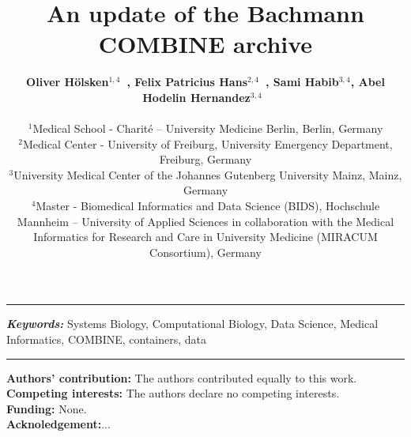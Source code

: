 \documentclass[a4paper, 12pt]{article}
\title{An update of the Bachmann COMBINE archive}
\date{} %
\providecommand{\keywords}[1]
{
  \small	
  \textbf{\textit{Keywords: }} #1
}
\begin{document}
\maketitle

  \noindent\author{\textbf{Oliver H\"olsken$^{1,4}$~, Felix Patricius Hans$^{2,4}$~, Sami Habib$^{3,4}$, Abel Hodelin Hernandez$^{3,4}$~} \\ \\
	\small $^{1}$Medical School - Charité – University Medicine Berlin, Berlin, Germany \\
	\small $^{2}$Medical Center - University of Freiburg, University Emergency Department, Freiburg, Germany \\
	\small $^{3}$University Medical Center of the Johannes Gutenberg University Mainz, Mainz, Germany \\
	\small $^{4}$Master - Biomedical Informatics and Data Science (BIDS), Hochschule Mannheim – University of Applied Sciences in collaboration with the Medical Informatics for Research and Care in University Medicine (MIRACUM Consortium), Germany \\
}

\hrule

 \hspace{10pt}

\noindent\keywords{Systems Biology, Computational Biology, Data Science, Medical Informatics, COMBINE, containers, data}

\hrule

\newpage








\noindent\small \textbf{Authors' contribution:} The authors contributed equally to this work. \\ 
\noindent\small \textbf{Competing interests:} The authors declare no competing interests.\\
\noindent\small \textbf{Funding:} None.\\
\noindent\small \textbf{Acknoledgement:}...



\nocite{*}           %
\printbibliography 
\end{document}

